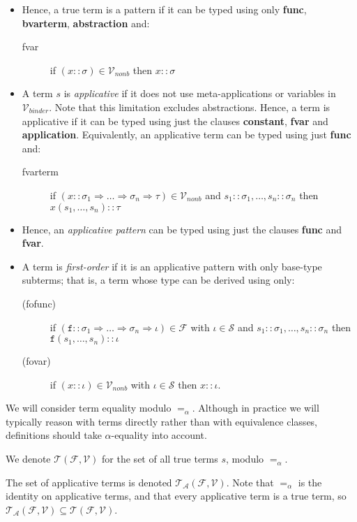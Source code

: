 \documentclass{lmcs}
\theoremstyle{theorem}\newtheorem{theorem}{Theorem}
\theoremstyle{theorem}\newtheorem{lemma}[theorem]{Lemma}
\theoremstyle{theorem}\newtheorem{corollary}[theorem]{Corollary}
\theoremstyle{definition}\newtheorem{definition}[theorem]{Definition}
\theoremstyle{definition}\newtheorem{example}[theorem]{Example}
\newcommand{\F}{\mathcal{F}}
\newcommand{\V}{\mathcal{V}}
\newcommand{\Vfree}{\mathcal{V}_{\mathit{nonb}}}
\newcommand{\Vbound}{\mathcal{V}_{\mathit{binder}}}
\newcommand{\Sorts}{\mathcal{S}}
\newcommand{\Terms}{\mathcal{T}}
\newcommand{\ATerms}{\mathcal{T}_{\mathcal{A}}}
\newcommand{\asort}{\iota}
\newcommand{\atype}{\sigma}
\newcommand{\btype}{\tau}
\newcommand{\identifier}[1]{\mathtt{#1}}
\newcommand{\afun}{\identifier{f}}
\newcommand{\avar}{x}
\newcommand{\clause}[1]{\textbf{#1}}
\newcommand{\arrtype}{\Rightarrow}
\begin{document}
\begin{itemize}
\item Hence, a true term is a pattern if it can be typed using only \clause{func},
  \clause{bvarterm}, \clause{abstraction} and:
  \begin{description}
  \item[fvar] if $(\avar :: \atype) \in \Vfree$ then $\avar :: \atype$
  \end{description}

\item A term $s$ is \emph{applicative} if it does not use meta-applications or variables in
  $\Vbound$.  Note that this limitation excludes abstractions.  Hence, a term is applicative if it
  can be typed using just the clauses \clause{constant}, \clause{fvar} and \clause{application}.
  Equivalently, an applicative term can be typed using just \textbf{func} and:
  \begin{description}
  \item[fvarterm] if $(\avar :: \atype_1 \arrtype \dots \arrtype \atype_n \arrtype \btype) \in
    \Vfree$ and $s_1 :: \atype_1,\dots,s_n :: \atype_n$ then $\avar(s_1,\dots,s_n) :: \btype$
  \end{description}
\item Hence, an \emph{applicative pattern} can be typed using just the clauses \clause{func} and
  \clause{fvar}.
\item A term is \emph{first-order} if it is an applicative pattern with only base-type subterms;
  that is, a term whose type can be derived using only:
  \begin{description}
  \item[(fofunc)] if $(\afun :: \atype_1 \arrtype \dots \arrtype \atype_n \arrtype \asort) \in \F$
    with $\asort \in \Sorts$ and $s_1 :: \atype_1,\dots,s_n :: \atype_n$ then
    $\afun(s_1,\dots,s_n) :: \asort$
  \item[(fovar)] if $(\avar :: \asort) \in \Vfree$ with $\asort \in \Sorts$ then $\avar :: \asort$.
  \end{description}
\end{itemize}

We will consider term equality modulo $=_\alpha$.  Although in practice we will typically reason
with terms directly rather than with equivalence classes, definitions should take $\alpha$-equality
into account.

We denote $\Terms(\F,\V)$ for the set of all true terms $s$, modulo $=_\alpha$.

The set of applicative terms is denoted $\ATerms(\F,\V)$.  Note that $=_\alpha$ is the
identity on applicative terms, and that every applicative term is a true term, so
$\ATerms(\F,\V) \subseteq \Terms(\F,\V)$.
\end{document}
